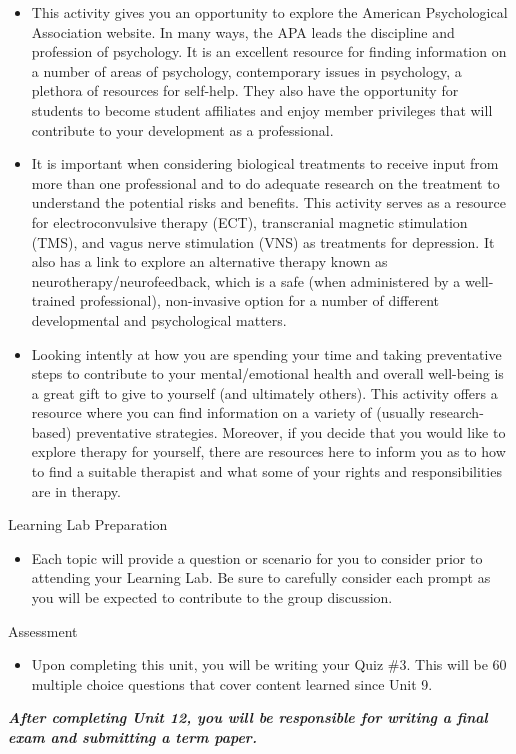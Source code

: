 \documentclass[
]{book}
\providecommand{\tightlist}{%
  \setlength{\itemsep}{0pt}\setlength{\parskip}{0pt}}
\begin{document}
\begin{reflect}
\begin{itemize}
\item
  This activity gives you an opportunity to explore the American Psychological Association website. In many ways, the APA leads the discipline and profession of psychology. It is an excellent resource for finding information on a number of areas of psychology, contemporary issues in psychology, a plethora of resources for self-help. They also have the opportunity for students to become student affiliates and enjoy member privileges that will contribute to your development as a professional.
\item
  It is important when considering biological treatments to receive input from more than one professional and to do adequate research on the treatment to understand the potential risks and benefits. This activity serves as a resource for electroconvulsive therapy (ECT), transcranial magnetic stimulation (TMS), and vagus nerve stimulation (VNS) as treatments for depression. It also has a link to explore an alternative therapy known as neurotherapy/neurofeedback, which is a safe (when administered by a well-trained professional), non-invasive option for a number of different developmental and psychological matters.
\item
  Looking intently at how you are spending your time and taking preventative steps to contribute to your mental/emotional health and overall well-being is a great gift to give to yourself (and ultimately others). This activity offers a resource where you can find information on a variety of (usually research-based) preventative strategies. Moreover, if you decide that you would like to explore therapy for yourself, there are resources here to inform you as to how to find a suitable therapist and what some of your rights and responsibilities are in therapy.
\end{itemize}

{Learning Lab Preparation}

\begin{itemize}
\tightlist
\item
  Each topic will provide a question or scenario for you to consider prior to attending your Learning Lab. Be sure to carefully consider each prompt as you will be expected to contribute to the group discussion.
\end{itemize}

{Assessment}

\begin{itemize}
\tightlist
\item
  Upon completing this unit, you will be writing your Quiz \#3. This will be 60 multiple choice questions that cover content learned since Unit 9.
\end{itemize}

\textbf{\emph{After completing Unit 12, you will be responsible for writing a final exam and submitting a term paper.}}
\end{reflect}
\end{document}
